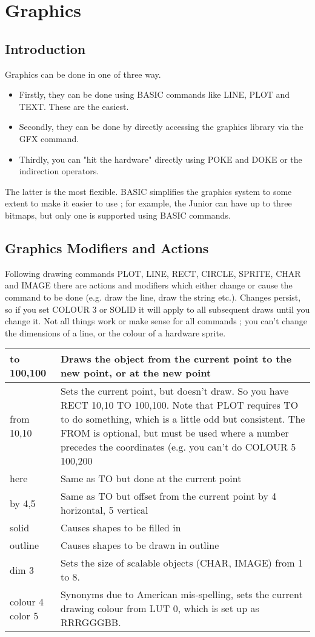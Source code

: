 \chapter{Graphics}

\section{Introduction}

Graphics can be done in one of three way. 

\begin{itemize}
\item Firstly, they can be done using BASIC commands like LINE, PLOT and TEXT. These are the easiest.
\item Secondly, they can be done by directly accessing the graphics library via the GFX command. 
\item Thirdly, you can "hit the hardware" directly using POKE and DOKE or the indirection operators.
\end{itemize}
The latter is the most flexible. BASIC simplifies the graphics system to some extent to make it easier to use ; for example, the Junior can have up to three bitmaps, but only one is supported using BASIC commands.

\section{Graphics Modifiers and Actions}
Following drawing commands PLOT, LINE, RECT, CIRCLE, SPRITE, CHAR and IMAGE there are actions and modifiers which either change or cause the command to be done (e.g. draw the line, draw the string etc.). 
Changes persist, so if you set COLOUR 3 or SOLID it will apply to all subsequent draws until you change it.
Not all things work or make sense for all commands ; you can’t change the dimensions of a line, or the colour of a hardware sprite.

\begin{tabular} {|p{1.0in}|p{4.5in}|}
\hline
to 100,100 & Draws the object from the current point to the new point, or at the new point \\
\hline
from 10,10 & Sets the current point, but doesn’t draw. So you have RECT 10,10 TO 100,100. Note that PLOT requires TO to do something, which is a little odd but consistent. The FROM is optional, but must be used where a number precedes the coordinates (e.g. you can’t do COLOUR 5 100,200 \\
\hline
here & Same as TO but done at the current point \\
\hline
by 4,5 & Same as TO but offset from the current point by 4 horizontal, 5 vertical \\
\hline
solid & Causes shapes to be filled in\\
\hline
outline & Causes shapes to be drawn in outline\\
\hline
dim 3 & Sets the size of scalable objects (CHAR, IMAGE) from 1 to 8.\\
\hline
colour 4 color 5 & Synonyms due to American mis-spelling, sets the current drawing colour from LUT 0, which is set up as  RRRGGGBB.
\end{tabular}\hline

